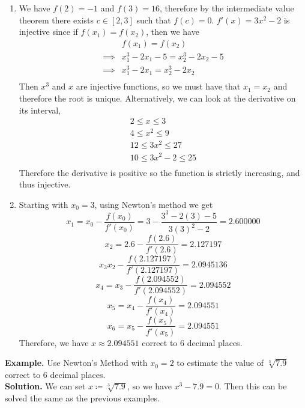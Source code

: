 \documentclass[openany]{report}
\begin{document}
\begin{enumerate}[label=(\roman*)]
    \item We have $f(2) = -1$ and $f(3) = 16$, therefore by the intermediate value theorem there exists $c \in [2,3]$ such that $f(c) = 0$. $f'(x) = 3x^2 - 2$ is injective since if $f(x_1) = f(x_2)$, then we have
    \begin{align*}
        &f(x_1) = f(x_2)\\
        \implies& x_1^3 - 2x_1 - 5 = x_2^3 - 2x_2 - 5\\
        \implies& x_1^3 - 2x_1 = x_2^3 - 2x_2\\
    \end{align*} 
    Then $x^3$ and $x$ are injective functions, so we must have that $x_1 = x_2$ and therefore the root is unique. Alternatively, we can look at the derivative on its interval, 
    \begin{align*}
        2 \leq x \leq 3\\
        4 \leq x^2 \leq 9\\
        12 \leq 3x^2 \leq 27\\
        10 \leq 3x^2 - 2 \leq 25\\
    \end{align*}
    Therefore the derivative is positive so the function is strictly increasing, and thus injective.
    \item Starting with $x_0 = 3$, using Newton's method we get 
    \[x_1 = x_0 - \frac{f(x_0)}{f'(x_0)} = 3 - \frac{3^3 - 2(3) - 5}{3(3)^2 - 2} = 2.600000\]
    \[x_2 = 2.6 - \frac{f(2.6)}{f'(2.6)} = 2.127197\]
    \[x_3 x_2 - \frac{f(2.127197)}{f'(2.127197)} = 2.0945136\]
    \[x_4 = x_3 - \frac{f(2.094552)}{f'(2.094552)} = 2.094552\]
    \[x_5 = x_4 - \frac{f(x_4)}{f'(x_4)} = 2.094551 \]
    \[x_6 = x_5 - \frac{f(x_5)}{f'(x_5)} = 2.094551\]
    Therefore, we have $x \approx 2.094551$ correct to 6 decimal places.
\end{enumerate}
\noindent
\textbf{Example.} Use Newton's Method with $x_0 = 2$ to estimate the value of $\sqrt[3]{7.9}$ correct to 6 decimal places.\\[2ex]
\textbf{Solution.} We can set $x \coloneqq \sqrt[3]{7.9}$, so we have $x^3 - 7.9 = 0$. Then this can be solved the same as the previous examples.
\end{document}
